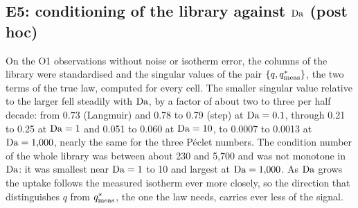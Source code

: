 \subsection*{E5: conditioning of the library against $\mathrm{Da}$ (post hoc)}
On the O1 observations without noise or isotherm error, the columns of the library were
standardised and the singular values of the pair $\{q, q^{*}_{\mathrm{meas}}\}$, the two terms of the true law,
computed for every cell. The smaller singular value relative to the larger fell steadily with
$\mathrm{Da}$, by a factor of about two to three per half decade: from 0.73 (Langmuir) and 0.78 to 0.79 (step) at
$\mathrm{Da} = 0.1$, through 0.21 to 0.25 at $\mathrm{Da} = 1$ and 0.051 to 0.060 at $\mathrm{Da} = 10$, to 0.0007 to 0.0013
at $\mathrm{Da} = 1{,}000$, nearly the same for the three P\'eclet numbers. The condition number of the whole
library was between about 230 and 5,700 and was not monotone in $\mathrm{Da}$: it was smallest near
$\mathrm{Da} = 1$ to 10 and largest at $\mathrm{Da} = 1{,}000$. As $\mathrm{Da}$ grows the uptake follows the measured
isotherm ever more closely, so the direction that distinguishes $q$ from $q^{*}_{\mathrm{meas}}$, the one the law
needs, carries ever less of the signal.

